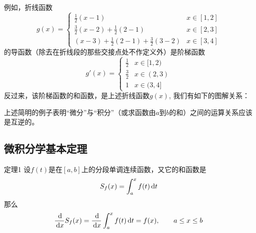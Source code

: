 例如，折线函数
\[g(x)=\begin{cases}
    \frac{1}{2}(x-1) & x\in[1,2]\\
    \frac{3}{2}(x-2)+\frac{1}{2}(2-1) & x\in [2,3]\\
    (x-3)+\frac{1}{2}(2-1)+\frac{3}{2}(3-2) & x\in [3,4]
\end{cases}\]
的导函数（除去在折线段的那些交接点处不作定义外）是阶梯函数
\[g'(x)=\begin{cases}
    \frac{1}{2} & x\in [1,2)\\
    \frac{3}{2} & x\in (2,3)\\
    1& x\in (3,4]
\end{cases}\]
反过来，该阶梯函数的和函数，是上述折线函数$g(x)$, 我们有如下的图解关系：
\begin{center}
\end{center}

上述简明的例子表明“微分”与“积分”（或求函数由$a$到$b$的和）之间的运算关系应该是互逆的。

\subsection{微积分学基本定理}

\begin{blk}
  {定理1} 设$f(t)$是在$[a,b]$上的分段单调连续函数，又它的和函数是
\[S_f(x)=\int^x_a f (t) \,{\rm d} t\]
那么
\[\dfrac{\,{\rm d} }{\,{\rm d} x}S_f(x)=\dfrac{\,{\rm d} }{\,{\rm d} x}\int^x_a f (t) \,{\rm d} t=f(x),\qquad a\le x\le b\]
\end{blk}

\begin{figure}[htp]
    \centering
    
    \caption{}
\end{figure}

